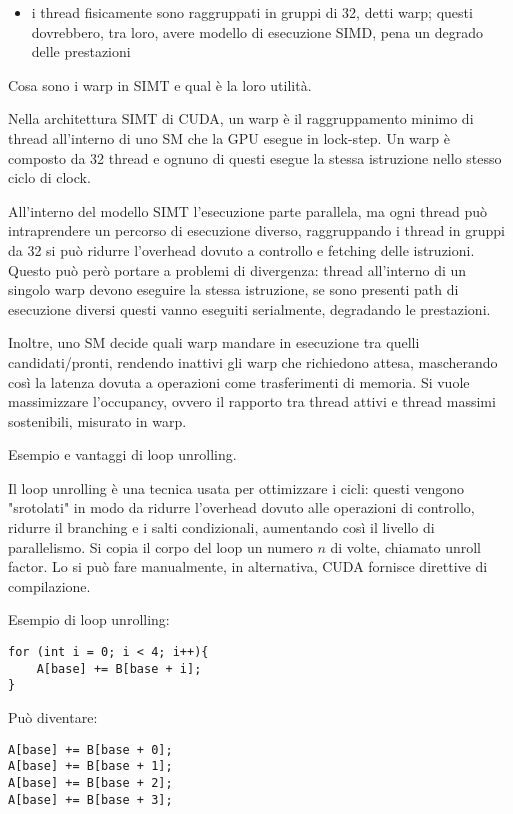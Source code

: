 \begin{questions}
\begin{solution}
\begin{itemize}
    		\item i thread fisicamente sono raggruppati in gruppi di 32, detti warp; questi dovrebbero, tra loro, avere modello di esecuzione SIMD, pena un degrado delle prestazioni 
    	\end{itemize}
    \end{solution}
    
    \question Cosa sono i warp in SIMT e qual è la loro utilità.
    
    \begin{solution}
    	Nella architettura SIMT di CUDA, un warp è il raggruppamento minimo di thread all'interno di uno SM che la GPU esegue in lock-step. Un warp è composto da 32 thread e ognuno di questi esegue la stessa istruzione nello stesso ciclo di clock. 
    	
    	All'interno del modello SIMT l'esecuzione parte parallela, ma ogni thread può intraprendere un percorso di esecuzione diverso, raggruppando i thread in gruppi da 32 si può ridurre l'overhead dovuto a controllo e fetching delle istruzioni. Questo può però portare a problemi di divergenza: thread all'interno di un singolo warp devono eseguire la stessa istruzione, se sono presenti path di esecuzione diversi questi vanno eseguiti serialmente, degradando le prestazioni.
    	
    	Inoltre, uno SM decide quali warp mandare in esecuzione tra quelli candidati/pronti, rendendo inattivi gli warp che richiedono attesa, mascherando così la latenza dovuta a operazioni come trasferimenti di memoria. Si vuole massimizzare l'occupancy, ovvero il rapporto tra thread attivi e thread massimi sostenibili, misurato in warp. 
    \end{solution}
    
    \question Esempio e vantaggi di loop unrolling.
    
    \begin{solution}
    	Il loop unrolling è una tecnica usata per ottimizzare i cicli: questi vengono "srotolati" in modo da ridurre l'overhead dovuto alle operazioni di controllo, ridurre il branching e i salti condizionali, aumentando così il livello di parallelismo. Si copia il corpo del loop un numero $n$ di volte, chiamato unroll factor. Lo si può fare manualmente, in alternativa, CUDA fornisce direttive di compilazione.
    	
    	Esempio di loop unrolling: 
    	\begin{verbatim}
for (int i = 0; i < 4; i++){
    A[base] += B[base + i];
}
    	\end{verbatim}
    	Può diventare:
    	\begin{verbatim}
A[base] += B[base + 0];
A[base] += B[base + 1];
A[base] += B[base + 2];
A[base] += B[base + 3];
    	\end{verbatim}
    	

\end{solution}
\end{questions}
